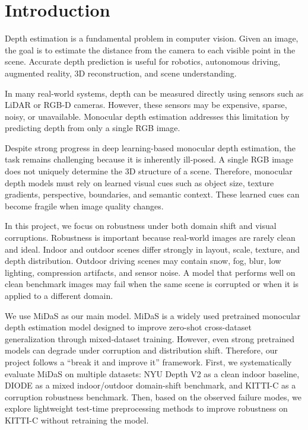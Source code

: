 \documentclass[10pt]{article}
\begin{document}
\section{Introduction}

Depth estimation is a fundamental problem in computer vision. Given an image, the goal is to estimate the distance from the camera to each visible point in the scene. Accurate depth prediction is useful for robotics, autonomous driving, augmented reality, 3D reconstruction, and scene understanding.

In many real-world systems, depth can be measured directly using sensors such as LiDAR or RGB-D cameras. However, these sensors may be expensive, sparse, noisy, or unavailable. Monocular depth estimation addresses this limitation by predicting depth from only a single RGB image.

Despite strong progress in deep learning-based monocular depth estimation, the task remains challenging because it is inherently ill-posed. A single RGB image does not uniquely determine the 3D structure of a scene. Therefore, monocular depth models must rely on learned visual cues such as object size, texture gradients, perspective, boundaries, and semantic context. These learned cues can become fragile when image quality changes.

In this project, we focus on robustness under both domain shift and visual corruptions. Robustness is important because real-world images are rarely clean and ideal. Indoor and outdoor scenes differ strongly in layout, scale, texture, and depth distribution. Outdoor driving scenes may contain snow, fog, blur, low lighting, compression artifacts, and sensor noise. A model that performs well on clean benchmark images may fail when the same scene is corrupted or when it is applied to a different domain.

We use MiDaS as our main model. MiDaS is a widely used pretrained monocular depth estimation model designed to improve zero-shot cross-dataset generalization through mixed-dataset training. However, even strong pretrained models can degrade under corruption and distribution shift. Therefore, our project follows a ``break it and improve it'' framework. First, we systematically evaluate MiDaS on multiple datasets: NYU Depth V2 as a clean indoor baseline, DIODE as a mixed indoor/outdoor domain-shift benchmark, and KITTI-C as a corruption robustness benchmark. Then, based on the observed failure modes, we explore lightweight test-time preprocessing methods to improve robustness on KITTI-C without retraining the model.
\end{document}
